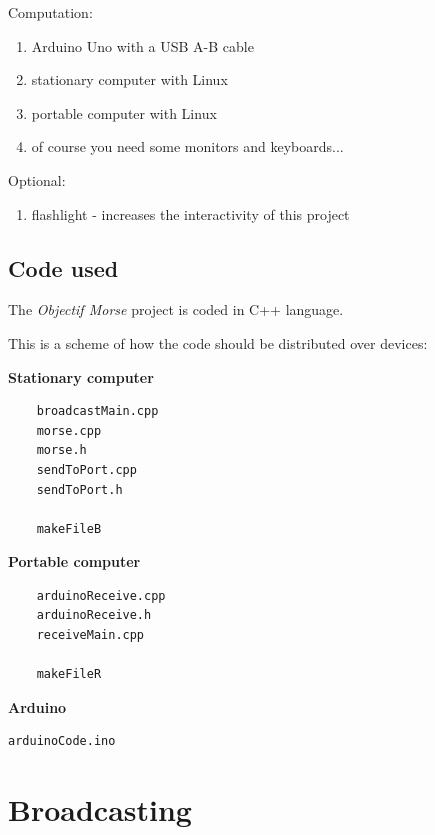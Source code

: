 \documentclass[12pt]{report}
\begin{document}
Computation:

\begin{enumerate}

\item Arduino Uno with a USB A-B cable
\item stationary computer with Linux
\item portable computer with Linux
\item of course you need some monitors and keyboards...

\end{enumerate}

Optional:

\begin{enumerate}

\item flashlight - increases the interactivity of this project

\end{enumerate}

\newpage

\section{Code used}

The \textit{Objectif Morse} project is coded in C++ language.

This is a scheme of how the code should be distributed over devices:

\textbf{Stationary computer}

\begin{verbatim}
	broadcastMain.cpp
	morse.cpp
	morse.h
	sendToPort.cpp
	sendToPort.h

	makeFileB
\end{verbatim}

\textbf{Portable computer}

\begin{verbatim}
	arduinoReceive.cpp
	arduinoReceive.h
	receiveMain.cpp

	makeFileR
\end{verbatim}

\textbf{Arduino}

\begin{verbatim}
arduinoCode.ino
\end{verbatim}

\newpage

\chapter{Broadcasting}
\end{document}
